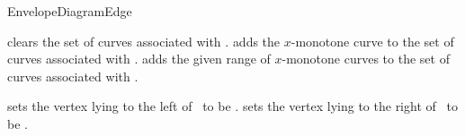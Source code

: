 \begin{ccRefConcept}{EnvelopeDiagramEdge}
\ccModifiers

    {clears the set of curves associated with \ccVar.}
\ccGlue
{}
    {adds the $x$-monotone curve  to the set of curves associated with \ccVar.}
\ccGlue
{}
    {adds the given range of $x$-monotone curves to the set of curves associated with \ccVar.}

    {sets the vertex lying to the left of \ccVar\ to be .}
\ccGlue
{}
    {sets the vertex lying to the right of \ccVar\ to be .}

\ccSeeAlso
     \\
     \\

\end{ccRefConcept}

\ccRefPageEnd

